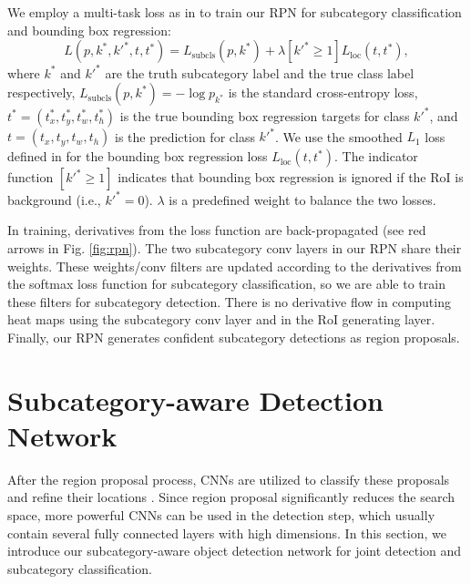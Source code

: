\documentclass[10pt,twocolumn,letterpaper]{article}
\begin{document}
We employ a multi-task loss as in \cite{girshick2015fast} to train our RPN for subcategory classification and bounding box regression:
\begin{equation}
	L(p,k^*,k'^{*},t,t^*) = L_{\text{subcls}}(p,k^*) + \lambda [k'^{*} \geq 1] L_{\text{loc}}(t,t^*),
\end{equation}
where $k^*$ and $k'^{*}$ are the truth subcategory label and the true class label respectively, $L_{\text{subcls}}(p,k^*) = -\log p_{k^*}$ is the standard cross-entropy loss, $t^{*} = (t_x^{*}, t_y^{*}, t_w^{*}, t_h^{*})$ is the true bounding box regression targets for class $k'^{*}$, and $t = (t_x, t_y, t_w, t_h)$ is the prediction for class $k'^{*}$. We use the smoothed $L_1$ loss defined in \cite{girshick2015fast} for the bounding box regression loss $L_{\text{loc}}(t,t^*)$. The indicator function $[k'^{*} \geq 1]$ indicates that bounding box regression is ignored if the RoI is background (i.e., $k'^* = 0$). $\lambda$ is a predefined weight to balance the two losses.



In training, derivatives from the loss function are back-propagated (see red arrows in Fig. \ref{fig:rpn}). The two subcategory conv layers in our RPN share their weights. These weights/conv filters are updated according to the derivatives from the softmax loss function for subcategory classification, so we are able to train these filters for subcategory detection. There is no derivative flow in computing heat maps using the subcategory conv layer and in the RoI generating layer. Finally, our RPN generates confident subcategory detections as region proposals.







\section{Subcategory-aware Detection Network}
\label{sec:det_net}

After the region proposal process, CNNs are utilized to classify these proposals and refine their locations \cite{girshick2013rich,girshick2015fast,ren2015faster}. Since region proposal significantly reduces the search space, more powerful CNNs can be used in the detection step, which usually contain several fully connected layers with high dimensions. In this section, we introduce our subcategory-aware object detection network for joint detection and subcategory classification.
\end{document}
